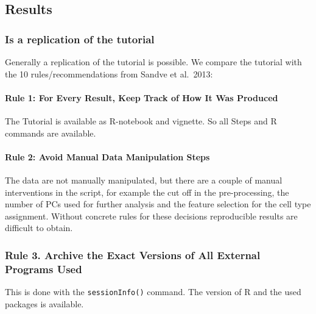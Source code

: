 \hypertarget{results}{%
\subsection{Results}\label{results}}

\hypertarget{is-a-replication-of-the-tutorial}{%
\subsubsection{Is a replication of the
tutorial}\label{is-a-replication-of-the-tutorial}}

Generally a replication of the tutorial is possible. We compare the
tutorial with the 10 rules/recommendations from Sandve et al.~2013:

\hypertarget{rule-1-for-every-result-keep-track-of-how-it-was-produced}{%
\paragraph{Rule 1: For Every Result, Keep Track of How It Was
Produced}\label{rule-1-for-every-result-keep-track-of-how-it-was-produced}}

The Tutorial is available as R-notebook and vignette. So all Steps and R
commands are available.

\hypertarget{rule-2-avoid-manual-data-manipulation-steps}{%
\paragraph{Rule 2: Avoid Manual Data Manipulation
Steps}\label{rule-2-avoid-manual-data-manipulation-steps}}

The data are not manually manipulated, but there are a couple of manual
interventions in the script, for example the cut off in the
pre-processing, the number of PCs used for further analysis and the
feature selection for the cell type assignment. Without concrete rules
for these decisions reproducible results are difficult to obtain.

\hypertarget{rule-3.-archive-the-exact-versions-of-all-external-programs-used}{%
\subsubsection{Rule 3. Archive the Exact Versions of All External
Programs
Used}\label{rule-3.-archive-the-exact-versions-of-all-external-programs-used}}

This is done with the \texttt{sessionInfo()} command. The version of R
and the used packages is available.


